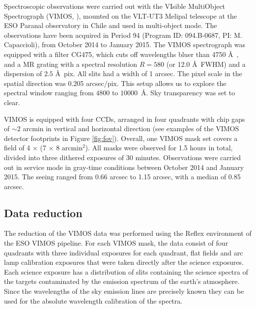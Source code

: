 \documentclass[useAMS,usenatbib]{mn2e}
\begin{document}
Spectroscopic observations were carried out with the VIsible MultiObject 
Spectrograph (VIMOS, \citealt{LeFevre}), mounted on the VLT-UT3 Melipal 
telescope at the ESO Paranal observatory in Chile and used in multi-object 
mode. The observations have been acquired in Period 94 (Program ID: 094.B-0687, 
PI: M. Capaccioli), from October 2014 to January 2015. 
The VIMOS spectrograph was equipped with a filter CG475, which cuts off 
wavelengths bluer than 4750 \AA\ , and a MR grating with a spectral resolution 
$R = 580$ (or 12.0 \AA\ FWHM) 
and a dispersion of $2.5$ \AA\/~pix. All slits had a width of 1 arcsec. The 
pixel scale in the spatial direction was 0.205 arcsec/pix. This setup allows us 
to explore the spectral window ranging from $4800$ to $10000$~\AA. Sky 
transparency was set to clear.

VIMOS is equipped with four CCDs, arranged in four quadrants with chip gaps of 
$\sim$2 arcmin in vertical and horizontal direction (see examples of the VIMOS 
detector footprints in Figure \ref{fig:fov}). Overall, one VIMOS mask set 
covers a field of 4 $\times$ (7 $\times$ 8 arcmin$^2$). All masks were observed 
for 1.5 hours in total, divided into three dithered exposures of 30 minutes. 
Observations were carried out in service mode in gray-time conditions between 
October 2014 and January 2015. The seeing ranged from 0.66 arcsec to 1.15 
arcsec, with a median of 0.85 arcsec. 

\subsection{Data reduction}

The reduction of the VIMOS data was performed using the Reflex 
environment \citep{Freudling13} of the ESO VIMOS pipeline. 
For each VIMOS mask, the data consist of four 
quadrants with three individual exposures for each quadrant, flat fields and
arc lamp calibration exposures that were taken directly after the science 
exposures. Each science exposure has a distribution of slits containing the 
science spectra of the targets contaminated by the emission spectrum of the 
earth's atmosphere. Since the wavelengths of the sky emission lines are 
precisely known they can be used for the absolute wavelength calibration of 
the spectra.
\end{document}
